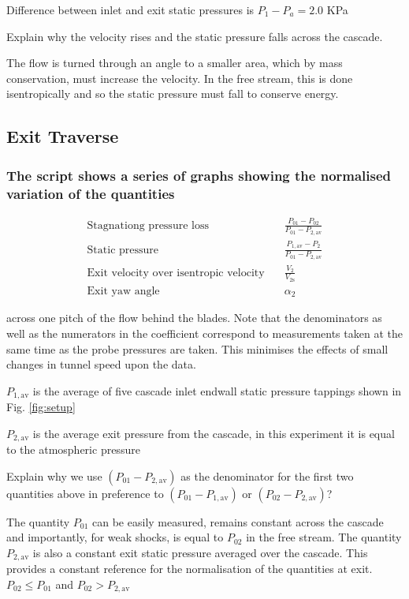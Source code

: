 \documentclass{article}
\begin{document}
Difference between inlet and exit static pressures is $P_1 - P_a = 2.0$ KPa

Explain why the velocity rises and the static pressure falls across the cascade.

The flow is turned through an angle to a smaller area, which by mass conservation, must increase the velocity.
In the free stream, this is done isentropically and so the static pressure must fall to conserve energy.

\subsection{Exit Traverse}
\subsubsection{The script shows a series of graphs showing the normalised variation of the quantities
}

\begin{align*}
    \text{Stagnationg pressure loss} \quad & \frac{P_{01} - P_{02}}{P_{01} - P_{2,\text{av}}} \\
    \text{Static pressure} \quad & \frac{P_{1,\text{av}} - P_2}{P_{01} - P_{2,\text{av}}} \\
    \text{Exit velocity over isentropic velocity} \quad & \frac{V_2}{V_{2\text{s}}} \\
    \text{Exit yaw angle} \quad & \alpha_2
\end{align*}

across one pitch of the flow behind the blades. Note that the denominators as well as the
numerators in the coefficient correspond to measurements taken at the same time as the probe
pressures are taken. This minimises the effects of small changes in tunnel speed upon the data.

$P_{1,\text{av}}$ is the average of five cascade inlet endwall static pressure tappings shown in Fig. \ref{fig:setup}

$P_{2,\text{av}}$ is the average exit pressure from the cascade, in this experiment it is equal to the
atmospheric pressure


Explain why we use $(P_{01} - P_{2,\text{av}})$ as the denominator for the first two quantities above in
preference to $(P_{01} - P_{1,\text{av}})$ or $(P_{02} - P_{2,\text{av}})$?

The quantity $P_{01}$ can be easily measured, remains constant across the cascade and importantly, for weak shocks, is equal to $P_{02}$ in the free stream.
The quantity $P_{2,\text{av}}$ is also a constant exit static pressure averaged over the cascade.
This provides a constant reference for the normalisation of the quantities at exit.
$ P_{02} \le P_{01} $ and $P_{02} > P_{2,\text{av}}$ 
\end{document}
